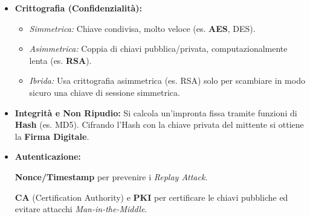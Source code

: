 \documentclass[a4paper,12pt]{report}
\begin{document}
{\begin{tcolorbox}[colback=blue!5!white, colframe=blue!75!black, title=\textbf{1. Gli Strumenti (Tecniche di base)}]
\begin{itemize}[leftmargin=*]
  \item \textbf{Crittografia (Confidenzialità):}
  \begin{itemize}
      \item \textit{Simmetrica:} Chiave condivisa, molto veloce (es. \textbf{AES}, DES).
      \item \textit{Asimmetrica:} Coppia di chiavi pubblica/privata, computazionalmente lenta (es. \textbf{RSA}).
      \item \textit{Ibrida:} Usa crittografia asimmetrica (es. RSA) solo per scambiare in modo sicuro una chiave di sessione simmetrica.
  \end{itemize}
  \item \textbf{Integrità e Non Ripudio:} Si calcola un'impronta fissa tramite funzioni di \textbf{Hash} (es. MD5). Cifrando l'Hash con la chiave privata del mittente si ottiene la \textbf{Firma Digitale}.
  \item \textbf{Autenticazione:} 
  
  \textbf{Nonce/Timestamp} per prevenire i \textit{Replay Attack}. 
  
  \textbf{CA} (Certification Authority) e \textbf{PKI} per certificare le chiavi pubbliche ed evitare attacchi \textit{Man-in-the-Middle}.
\end{itemize}
\end{tcolorbox}

\vspace{0.4cm}

}
\end{document}
